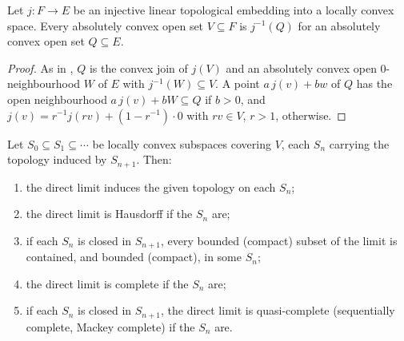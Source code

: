 \begin{lemma}
  \label{lem:ds-extension}
  \leanok
  Let $j \colon F \to E$ be an injective linear topological embedding into a locally convex space.
  Every absolutely convex open set $V \subseteq F$ is $j^{-1}(Q)$ for an absolutely convex open set
  $Q \subseteq E$.
\end{lemma}

\begin{proof}
  \leanok
  As in \cite{GN26}, $Q$ is the convex join of $j(V)$ and an absolutely convex open
  $0$-neighbourhood $W$ of $E$ with $j^{-1}(W) \subseteq V$. A point $a\, j(v) + b w$ of $Q$ has the
  open neighbourhood $a\, j(v) + b W \subseteq Q$ if $b > 0$, and $j(v) = r^{-1} j(rv) + (1 - r^{-1})
  \cdot 0$ with $rv \in V$, $r > 1$, otherwise.
\end{proof}

\begin{theorem}
  \label{thm:ds-strict}
  \leanok
  Let $S_0 \subseteq S_1 \subseteq \cdots$ be locally convex subspaces covering $V$, each $S_n$
  carrying the topology induced by $S_{n+1}$. Then:
  \begin{enumerate}
    \item the direct limit induces the given topology on each $S_n$;
    \item the direct limit is Hausdorff if the $S_n$ are;
    \item if each $S_n$ is closed in $S_{n+1}$, every bounded (compact) subset of the limit is
      contained, and bounded (compact), in some $S_n$;
    \item the direct limit is complete if the $S_n$ are;
    \item if each $S_n$ is closed in $S_{n+1}$, the direct limit is quasi-complete (sequentially
      complete, Mackey complete) if the $S_n$ are.
  \end{enumerate}
\end{theorem}

